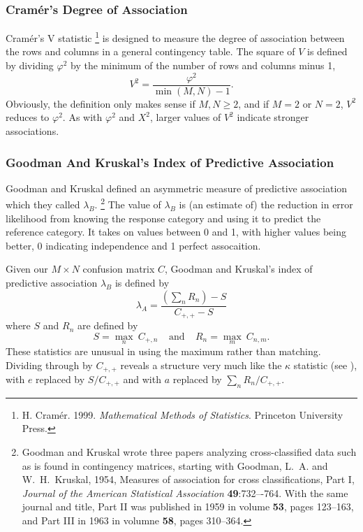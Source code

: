 \subsubsection{Cramér's Degree of Association}

Cramér's V statistic%
%
\footnote{H. Cramér. 1999. {\it Mathematical Methods of
    Statistics}. Princeton University Press.}
%
is designed to measure the degree of association between the
rows and columns in a general contingency table.   The square of
$V$ is defined by dividing $\varphi^2$ by the minimum of the number
of rows and columns minus 1,
%
\begin{equation}
V^2 = \frac{\varphi^2}{\min(M,N)-1}.
\end{equation}
%
Obviously, the definition only makes sense if $M,N \geq 2$, and if
$M=2$ or $N=2$, $V^2$ reduces to $\varphi^2$.  As with $\varphi^2$ and
$X^2$, larger values of $V^2$ indicate stronger associations.

\subsubsection{Goodman And Kruskal's Index of Predictive Association}

Goodman and Kruskal defined an asymmetric measure of predictive
association which they called $\lambda_B$.%
%
\footnote{Goodman and Kruskal wrote three papers analyzing
  cross-classified data such as is found in contingency matrices,
  starting with Goodman, L.~A. and W.~H.~Kruskal, 1954, Measures of
  association for cross classifications, Part I, {\it Journal of the
    American Statistical Association} {\bf 49}:732–-764.  With the
  same journal and title, Part II was
  published in 1959 in volume {\bf 53}, pages 123--163, and Part III
  in 1963 in volumne {\bf 58}, pages 310--364.}
%
The value of $\lambda_B$ is (an estimate of) the reduction in error
likelihood from knowing the response category and using it to predict
the reference category.  It takes on values between 0 and 1, with
higher values being better, 0 indicating independence and 1 perfect
assocaition.  

Given our $M \times N$ confusion matrix $C$, Goodman and Kruskal's
index of predictive association $\lambda_B$ is defined by
%
\begin{equation}
\lambda_A 
= \frac{\left(\sum_n R_n\right) - S}
       {C_{+,+} - S}
\end{equation}
%
where $S$ and $R_n$ are defined by 
%
\begin{equation}
S = \max_n \ C_{+,n}
\ \ \ \ \ \mbox{and} \ \ \ \ \
R_n = \max_m \ C_{n,m}.
\end{equation}
%
These statistics are unusual in using the maximum rather than
matching.  Dividing through by $C_{+,+}$ reveals a structure very much
like the $\kappa$ statistic (see \refsec{stats-kappa}), with $e$
replaced by $S/C_{+,+}$ and with $a$ replaced by $\sum_n R_n /
C_{+,+}$.

